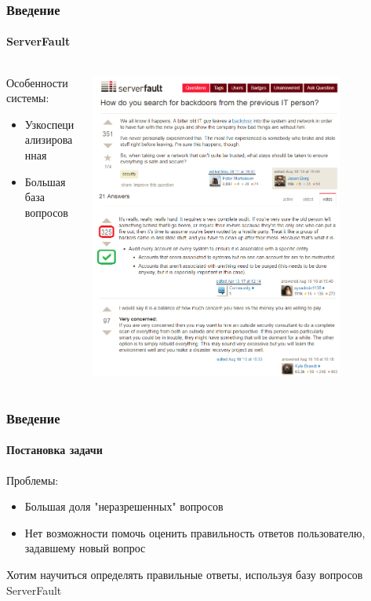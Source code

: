 \documentclass[10pt]{beamer}
\begin{document}

\begin{frame}
\frametitle{Введение}
\framesubtitle{ServerFault}

\begin{columns}
    \begin{column}{0.4\textwidth}
    	Особенности системы:
    	\begin{itemize}
			\item Узкоспециализированная
			\item Большая база вопросов
    	\end{itemize}
    \end{column}
    \begin{column}{0.6\textwidth}
        \begin{center}
            \includegraphics[width=0.8\textwidth]{images/serverfault_screen.png}
        \end{center}
    \end{column}
\end{columns}

\end{frame}


\begin{frame}
\frametitle{Введение}
\framesubtitle{Постановка задачи}

Проблемы:
\begin{itemize}
	\item Большая доля "неразрешенных" вопросов
	\item Нет возможности помочь оценить правильность ответов пользователю, задавшему новый вопрос
\end{itemize}

\vskip0.5cm

Хотим научиться определять правильные ответы, используя базу вопросов ServerFault

\end{frame}
\end{document}

